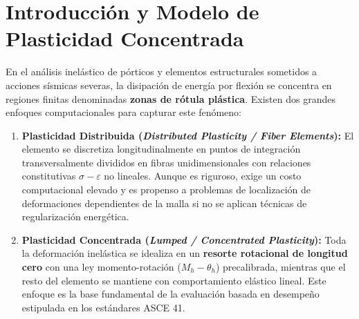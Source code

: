 \documentclass[11pt,letterpaper]{article}
\begin{document}
\vspace{0.35cm}

\section{Introducción y Modelo de Plasticidad Concentrada}

En el análisis inelástico de pórticos y elementos estructurales sometidos a acciones sísmicas severas, la disipación de energía por flexión se concentra en regiones finitas denominadas \textbf{zonas de rótula plástica}. Existen dos grandes enfoques computacionales para capturar este fenómeno:
\begin{enumerate}
    \item \textbf{Plasticidad Distribuida (\textit{Distributed Plasticity / Fiber Elements}):} El elemento se discretiza longitudinalmente en puntos de integración transversalmente divididos en fibras unidimensionales con relaciones constitutivas $\sigma - \varepsilon$ no lineales. Aunque es riguroso, exige un costo computacional elevado y es propenso a problemas de localización de deformaciones dependientes de la malla si no se aplican técnicas de regularización energética.
    \item \textbf{Plasticidad Concentrada (\textit{Lumped / Concentrated Plasticity}):} Toda la deformación inelástica se idealiza en un \textbf{resorte rotacional de longitud cero} con una ley momento-rotación ($M_h - \theta_h$) precalibrada, mientras que el resto del elemento se mantiene con comportamiento elástico lineal. Este enfoque es la base fundamental de la evaluación basada en desempeño estipulada en los estándares ASCE 41.
\end{enumerate}
\end{document}
